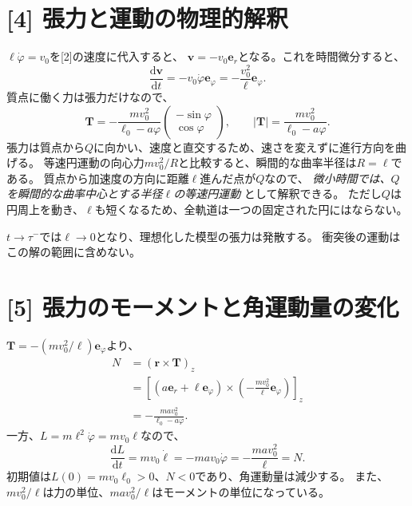 \documentclass[11pt,a4paper]{article}
\begin{document}
\section*{[4] 張力と運動の物理的解釈}
$\ell\dot\varphi=v_0$を[2]の速度に代入すると、
$\boldsymbol{v}=-v_0\boldsymbol{e}_r$となる。これを時間微分すると、
\begin{equation}
  \frac{\mathrm{d}\boldsymbol{v}}{\mathrm{d}t}
  =-v_0\dot\varphi\boldsymbol{e}_{\varphi}
  =-\frac{v_0^2}{\ell}\boldsymbol{e}_{\varphi}.
\end{equation}
質点に働く力は張力だけなので、
\begin{equation}
  \boxed{\boldsymbol{T}
  =-\frac{mv_0^2}{\ell_0-a\varphi}
    \begin{pmatrix}-\sin\varphi\\\cos\varphi\end{pmatrix},\qquad
    |\boldsymbol{T}|=\frac{mv_0^2}{\ell_0-a\varphi}.}
\end{equation}
張力は質点から$Q$に向かい、速度と直交するため、速さを変えずに進行方向を曲げる。
等速円運動の向心力$mv_0^2/R$と比較すると、瞬間的な曲率半径は$R=\ell$である。
質点から加速度の方向に距離$\ell$進んだ点が$Q$なので、
\emph{微小時間では、$Q$を瞬間的な曲率中心とする半径$\ell$の等速円運動}
として解釈できる。
ただし$Q$は円周上を動き、$\ell$も短くなるため、全軌道は一つの固定された円にはならない。

$t\to\tau^{-}$では$\ell\to0$となり、理想化した模型の張力は発散する。
衝突後の運動はこの解の範囲に含めない。

\section*{[5] 張力のモーメントと角運動量の変化}
$\boldsymbol{T}=-(mv_0^2/\ell)\boldsymbol{e}_{\varphi}$より、
\begin{align}
  N&=(\boldsymbol{r}\times\boldsymbol{T})_z\\
   &=\left[(a\boldsymbol{e}_r+\ell\boldsymbol{e}_{\varphi})
      \times\left(-\frac{mv_0^2}{\ell}\boldsymbol{e}_{\varphi}\right)\right]_z\\
   &=\boxed{-\frac{mav_0^2}{\ell_0-a\varphi}.}
\end{align}
一方、$L=m\ell^2\dot\varphi=mv_0\ell$なので、
\begin{equation}
  \frac{\mathrm{d}L}{\mathrm{d}t}
  =mv_0\dot\ell=-mav_0\dot\varphi
  =-\frac{mav_0^2}{\ell}=N.
\end{equation}
初期値は$L(0)=mv_0\ell_0>0$、$N<0$であり、角運動量は減少する。
また、$mv_0^2/\ell$は力の単位、$mav_0^2/\ell$はモーメントの単位になっている。
\end{document}
